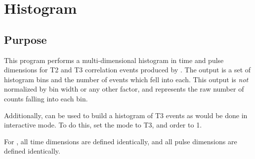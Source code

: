 \section{Histogram}
\label{sec:histogram}

\subsection{Purpose}
This program performs a multi-dimensional histogram in time and pulse dimensions for T2 and T3 correlation events produced by . The output is a set of histogram bins and the number of events which fell into each. This output is \textit{not} normalized by bin width or any other factor, and represents the raw number of counts falling into each bin.

Additionally,  can be used to build a histogram of T3 events as would be done in interactive mode. To do this, set the mode to T3, and order to 1.

For , all time dimensions are defined identically, and all pulse dimensions are defined identically.



